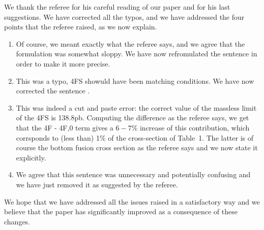 \documentclass[12pt]{article}
\begin{document}
We thank the referee for his careful reading of our paper and for his
last suggestions. We have corrected  all the  typos, and we have
addressed the four points that the referee raised, as we now explain.
\begin{enumerate}
\item{Of course, we meant exactly what the referee says, and we agree
  that the formulation was somewhat sloppy. We have now refromulated
  the sentence in order to make it more precise.
  }
\item{This was  a typo, 4FS showuld have been  matching conditions. We
  have now corrected the sentence .}
\item{This was indeed  a cut and paste error: the correct value of the
  massless limit of the 4FS is 138.8pb. Computing the difference as
  the referee says, we get that the  4F - 4F,0 term
  gives a $6-7\%$ increase of this contribution, which corrsponds to
  (less than) 1\% of the cross-section of Table~1.
The latter is of
  course the bottom fusion cross section as the referee says and we
  now state it explicitly.}
\item{We agree that this sentence was unnecessary and potentially
  confusing and we have just removed it as suggested by the referee.}
\end{enumerate}
We hope that we have addressed all the issues raised in a satisfactory
way and we believe that the paper has significantly improved as a
consequence of these changes.
\end{document}
